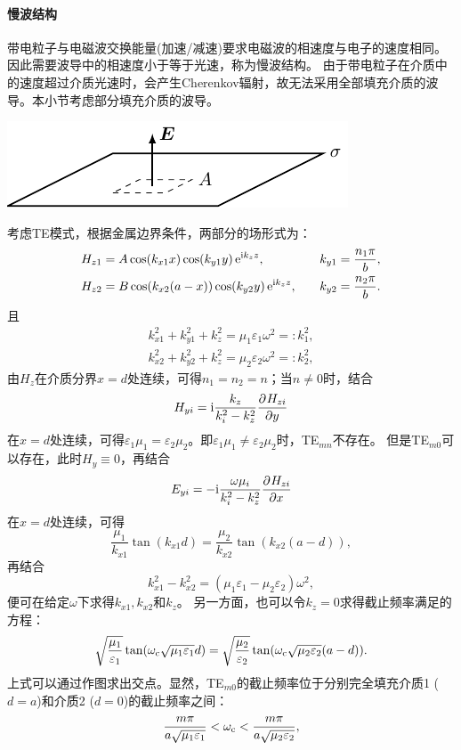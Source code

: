 \paragraph{慢波结构}
带电粒子与电磁波交换能量(加速/减速)要求电磁波的相速度与电子的速度相同。
因此需要波导中的相速度小于等于光速，称为慢波结构。
由于带电粒子在介质中的速度超过介质光速时，会产生Cherenkov辐射，故无法采用全部填充介质的波导。本小节考虑部分填充介质的波导。
\begin{center}
    \includegraphics[page=29]{figures/tikz/layouts.pdf}
    \label{fig:rectangle waveguide part-filled}
\end{center}
考虑TE模式，根据金属边界条件，两部分的场形式为：
\begin{alignat*}{2}
    H_{z1}&=A\cos(k_{x1}x)\cos(k_{y1}y)\mathop{}\!\mathrm{e}^{\mathrm{i} k_zz},&k_{y1}&=\frac{n_1\pi}b,\\
    H_{z2}&=B\cos(k_{x2}(a-x))\cos(k_{y2}y)\mathop{}\!\mathrm{e}^{\mathrm{i} k_zz},&\quad k_{y2}&=\frac{n_2\pi}b.
\end{alignat*}
且
\begin{subequations}
    \begin{align}
        k_{x1}^2+k_{y1}^2+k_z^2=\mu_1\varepsilon_1\omega^2=:k_1^2,\\
        k_{x2}^2+k_{y2}^2+k_z^2=\mu_2\varepsilon_2\omega^2=:k_2^2,
    \end{align}
\end{subequations}
由$H_z$在介质分界$x=d$处连续，可得$n_1=n_2=n$；当$n\neq 0$时，结合
\[
    H_{yi}=\mathrm{i}\frac{k_z}{k_i^2-k_z^2}\frac{\partial^{{}}H_{zi}}{\partial{y}^{{}}}
\]
在$x=d$处连续，可得$\varepsilon_1\mu_1=\varepsilon_2\mu_2$。即$\varepsilon_1\mu_1\neq\varepsilon_2\mu_2$时，TE$_{mn}$不存在。
但是TE$_{m0}$可以存在，此时$H_y\equiv 0$，再结合
\[
    E_{yi}=-\mathrm{i}\frac{\omega\mu_i}{k_i^2-k_z^2}\frac{\partial^{{}}H_{zi}}{\partial{x}^{{}}}
\]
在$x=d$处连续，可得
\begin{equation}
    \frac{\mu_1}{k_{x1}}\tan(k_{x1}d)=\frac{\mu_2}{k_{x2}}\tan(k_{x2}(a-d)),
\end{equation}
再结合
\begin{equation}
    k_{x1}^2-k_{x2}^2=(\mu_1\varepsilon_1-\mu_2\varepsilon_2)\omega^2,
\end{equation}
便可在给定$\omega$下求得$k_{x1},k_{x2}$和$k_z$。
另一方面，也可以令$k_z=0$求得截止频率满足的方程：
\begin{equation}
    \sqrt{\frac{\mu_1}{\varepsilon_1}}\tan(\omega_\text c\sqrt{\mu_1\varepsilon_1}d)=
    \sqrt{\frac{\mu_2}{\varepsilon_2}}\tan(\omega_\text c\sqrt{\mu_2\varepsilon_2}(a-d)).
\end{equation}
上式可以通过作图求出交点。显然，TE$_{m0}$的截止频率位于分别完全填充介质1 ($d=a$)和介质2 ($d=0$)的截止频率之间：
\[
    \frac{m\pi}{a\sqrt{\mu_1\varepsilon_1}}<\omega_\text c<\frac{m\pi}{a\sqrt{\mu_2\varepsilon_2}},
\]

